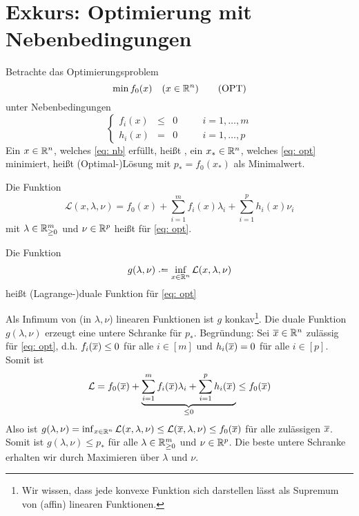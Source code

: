 \section{Exkurs: Optimierung mit Nebenbedingungen}

Betrachte das Optimierungsproblem
\begin{equation*}
	\min f_0(x) \quad (x \in \mathbb{R}^n)
	\tag{OPT} \label{eq: opt}
\end{equation*}
unter Nebenbedingungen
\begin{equation*}
	\left\{ \begin{array}{rclcl}
	f_i(x) &\le& 0 & \quad & i = 1, \dots, m \\
	h_i(x) &=& 0 & \quad & i = 1, \dots, p
	\end{array} \right.
	\tag{NB} \label{eq: nb}
\end{equation*}
Ein $x \in \mathbb{R}^n$, welches \eqref{eq: nb} erfüllt, heißt , ein $x_\ast \in \mathbb{R}^n$, welches \eqref{eq: opt} minimiert, heißt (Optimal-)Lösung mit $p_\ast = f_0(x_\ast)$ als Minimalwert.

\begin{*definition}
	Die Funktion 
	\begin{equation*}
		\mathcal{L}(x,\lambda, \nu) = f_0(x) + \sum_{i=1}^m f_i(x) \lambda_i + \sum_{i=1}^p h_i(x) \nu_i
	\end{equation*}
	mit $\lambda \in \mathbb{R}^m_{\ge 0}$ und $\nu \in \mathbb{R}^p$ heißt  für \eqref{eq: opt}.
	
	Die Funktion
	\begin{equation*}
		g(\lambda, \nu) \defeq \inf_{x \in \Rn} \mathcal{L}(x,\lambda,\nu)
	\end{equation*}
	heißt (Lagrange-)duale Funktion für \eqref{eq: opt}
\end{*definition}

\begin{*bemerkung}
	Als Infimum von (in $\lambda, \nu$) linearen Funktionen ist $g$ konkav\footnote{Wir wissen, dass jede konvexe Funktion sich darstellen lässt als Supremum von (affin) linearen Funktionen.}. Die duale Funktion $g(\lambda, \nu)$ erzeugt eine untere Schranke für $p_\ast$. Begründung: Sei $\overline{x} \in \mathbb{R}^n$ zulässig für \eqref{eq: opt}, d.h. $f_i(\overline{x}) \le 0$ für alle $i \in [m]$ und $h_i(\overline{x}) = 0$ für alle $i \in [p]$.  Somit ist
	\begin{equation*}
		\mathcal{L} = f_0(\overline{x}) + \underbrace{\sum_{i=1}^m f_i(\overline{x}) \lambda_i + \sum_{i=1}^p h_i(\overline{x})}_{\le 0} \le f_0(\overline{x})
	\end{equation*}
	Also ist $g(\lambda, \nu) = \inf_{x \in \mathbb{R}^n} \mathcal{L}(x,\lambda,\nu) \le \mathcal{L}(\overline{x}, \lambda, \nu) \le f_0(\overline{x})$ für alle zulässigen $\overline{x}$. Somit ist $g(\lambda, \nu) \le p_\ast$ für alle $\lambda \in \mathbb{R}^m_{\ge 0}$ und $\nu \in \mathbb{R}^p$. Die beste untere Schranke erhalten wir durch Maximieren über $\lambda$ und $\nu$.
\end{*bemerkung}

